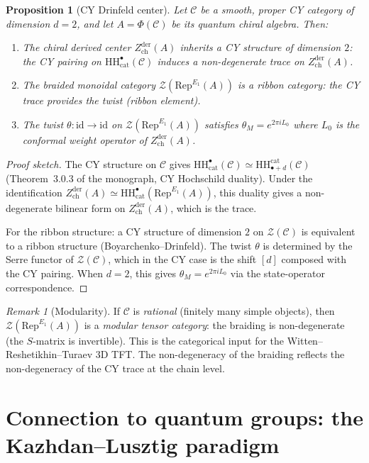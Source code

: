 \documentclass[11pt]{article}
\newtheorem{proposition}[theorem]{Proposition}
\theoremstyle{definition}
\theoremstyle{remark}
\newtheorem{remark}[theorem]{Remark}
\newcommand{\Rep}{\mathrm{Rep}}
\newcommand{\HH}{\mathrm{HH}}
\newcommand{\id}{\mathrm{id}}
\newcommand{\cC}{\mathcal{C}}
\newcommand{\cZ}{\mathcal{Z}}
\newcommand{\Zder}{Z^{\mathrm{der}}_{\mathrm{ch}}}
\begin{document}
\begin{proposition}[CY Drinfeld center]
\label{prop:cy-drinfeld-center}
Let $\cC$ be a smooth, proper CY category of dimension $d = 2$, and let $A = \Phi(\cC)$ be its quantum chiral algebra. Then:
\begin{enumerate}[label=(\roman*)]
 \item The chiral derived center $\Zder(A)$ inherits a CY structure of dimension $2$: the CY pairing on $\HH^\bullet_{\mathrm{cat}}(\cC)$ induces a non-degenerate trace on $\Zder(A)$.
 \item The braided monoidal category $\cZ(\Rep^{E_1}(A))$ is a \emph{ribbon} category: the CY trace provides the twist (ribbon element).
 \item The twist $\theta \colon \id \to \id$ on $\cZ(\Rep^{E_1}(A))$ satisfies $\theta_M = e^{2\pi i L_0}$ where $L_0$ is the conformal weight operator of $\Zder(A)$.
\end{enumerate}
\end{proposition}

\begin{proof}[Proof sketch]
The CY structure on $\cC$ gives $\HH^\bullet_{\mathrm{cat}}(\cC) \simeq \HH^{\mathrm{cat}}_{\bullet+d}(\cC)$ (Theorem~3.0.3 of the monograph, CY Hochschild duality). Under the identification $\Zder(A) \simeq \HH^\bullet_{\mathrm{cat}}(\Rep^{E_1}(A))$, this duality gives a non-degenerate bilinear form on $\Zder(A)$, which is the trace.

For the ribbon structure: a CY structure of dimension $2$ on $\cZ(\cC)$ is equivalent to a ribbon structure (Boyarchenko--Drinfeld). The twist $\theta$ is determined by the Serre functor of $\cZ(\cC)$, which in the CY case is the shift $[d]$ composed with the CY pairing. When $d = 2$, this gives $\theta_M = e^{2\pi i L_0}$ via the state-operator correspondence.
\end{proof}

\begin{remark}[Modularity]
\label{rem:modularity}
If $\cC$ is \emph{rational} (finitely many simple objects), then $\cZ(\Rep^{E_1}(A))$ is a \emph{modular tensor category}: the braiding is non-degenerate (the $S$-matrix is invertible). This is the categorical input for the Witten--Reshetikhin--Turaev 3D TFT. The non-degeneracy of the braiding reflects the non-degeneracy of the CY trace at the chain level.
\end{remark}


\section{Connection to quantum groups: the Kazhdan--Lusztig paradigm}
\label{sec:quantum-groups}
\end{document}
